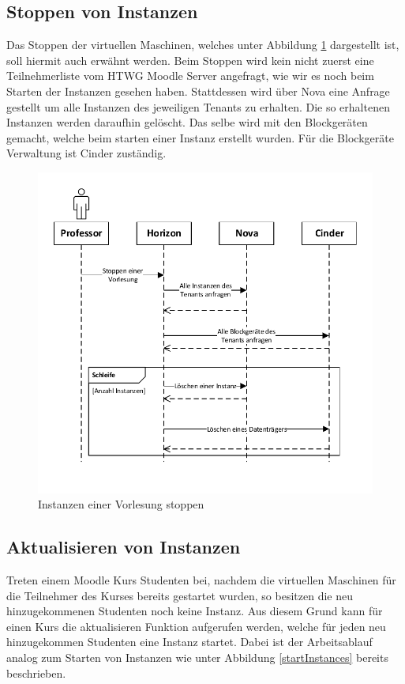 \subsection{Stoppen von Instanzen}
Das Stoppen der virtuellen Maschinen, welches unter Abbildung \ref{stopInstances} dargestellt ist,
soll hiermit auch erwähnt werden.
Beim Stoppen wird kein nicht zuerst eine Teilnehmerliste vom HTWG Moodle Server angefragt, wie
wir es noch beim Starten der Instanzen gesehen haben. Stattdessen wird über Nova eine Anfrage
gestellt um alle Instanzen des jeweiligen Tenants zu erhalten. Die so erhaltenen Instanzen werden
daraufhin gelöscht. Das selbe wird mit den Blockgeräten gemacht, welche beim starten einer
Instanz erstellt wurden. Für die Blockgeräte Verwaltung ist Cinder zuständig.

\begin{figure}[H]
	\centering
	\includegraphics[scale=0.6]{img/stopInstances.pdf}
\caption{Instanzen einer Vorlesung stoppen}
\label{stopInstances}
\FloatBarrier
\end{figure}

\subsection{Aktualisieren von Instanzen}
Treten einem Moodle Kurs Studenten bei, nachdem die virtuellen Maschinen für die
Teilnehmer des Kurses bereits gestartet wurden, so besitzen die neu hinzugekommenen Studenten noch
keine Instanz. Aus diesem Grund kann für einen Kurs die aktualisieren Funktion aufgerufen werden,
welche für jeden neu hinzugekommen Studenten eine Instanz startet. 
Dabei ist der Arbeitsablauf analog zum Starten von Instanzen wie unter Abbildung 
\ref{startInstances} bereits beschrieben.

